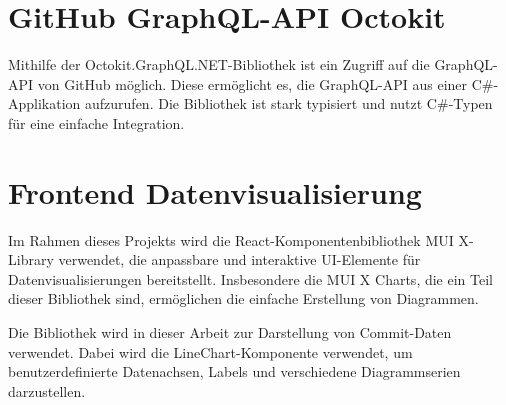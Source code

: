 \section{GitHub GraphQL-API Octokit}
Mithilfe der Octokit.GraphQL.NET-Bibliothek ist ein Zugriff auf die GraphQL-API von GitHub möglich. Diese ermöglicht es, die GraphQL-API aus einer C\#-App\-likation aufzurufen. Die Bibliothek ist stark typisiert und nutzt C\#-Typen für eine einfache Integration.
\parencite{noauthor_octokitoctokitgraphqlnet_2025}


\section{Frontend Datenvisualisierung}
Im Rahmen dieses Projekts wird die React-Komponentenbibliothek MUI X-Library verwendet, die anpassbare und interaktive UI-Elemente für Datenvisualisierungen bereitstellt. Insbesondere die MUI X Charts, die ein Teil dieser Bibliothek sind, ermöglichen die einfache Erstellung von Diagrammen.

Die Bibliothek wird in dieser Arbeit zur Darstellung von Commit-Daten verwendet. Dabei wird die LineChart-Komponente verwendet, um benutzerdefinierte Datenachsen, Labels und verschiedene Diagrammserien darzustellen. \parencite{noauthor_react_nodate}
